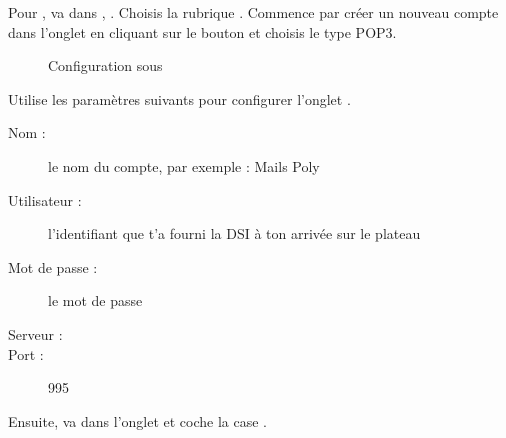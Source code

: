 Pour , va dans , . Choisis la
rubrique . Commence par cr\'eer un nouveau compte dans
l'onglet  en cliquant sur le bouton
 et choisis le type POP3.


\noindent
  \begin{figure}[!h]
    \begin{center}  
 \caption{Configuration sous }
    \end{center}
  \end{figure}


Utilise les param\`etres suivants pour configurer l'onglet .
\begin{description}
  \item[Nom : ] le nom du compte, par exemple : Mails Poly
  \item[Utilisateur : ] l'identifiant  que t'a fourni la DSI \`a  ton arriv\'ee sur le plateau
  \item[Mot de passe : ] le mot de passe 
  \item[Serveur : ] 
  \item[Port : ] 995
\end{description}
Ensuite, va dans l'onglet  et coche la case
.

